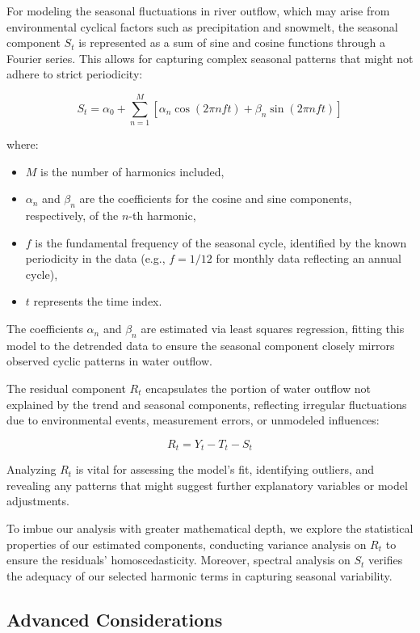 \documentclass[pre,12pt]{revtex4-1}
\begin{document}
For modeling the seasonal fluctuations in river outflow, which may arise from environmental cyclical factors such as precipitation and snowmelt, the seasonal component \(S_t\) is represented as a sum of sine and cosine functions through a Fourier series. This allows for capturing complex seasonal patterns that might not adhere to strict periodicity:

\[ S_t = \alpha_0 + \sum_{n=1}^{M} [\alpha_n \cos(2\pi n f t) + \beta_n \sin(2\pi n f t)] \]

where:
\begin{itemize}
    \item \(M\) is the number of harmonics included,
    \item \(\alpha_n\) and \(\beta_n\) are the coefficients for the cosine and sine components, respectively, of the \(n\)-th harmonic,
    \item \(f\) is the fundamental frequency of the seasonal cycle, identified by the known periodicity in the data (e.g., \(f=1/12\) for monthly data reflecting an annual cycle),
    \item \(t\) represents the time index.
\end{itemize}

The coefficients \(\alpha_n\) and \(\beta_n\) are estimated via least squares regression, fitting this model to the detrended data to ensure the seasonal component closely mirrors observed cyclic patterns in water outflow.


The residual component \(R_t\) encapsulates the portion of water outflow not explained by the trend and seasonal components, reflecting irregular fluctuations due to environmental events, measurement errors, or unmodeled influences:

\[ R_t = Y_t - T_t - S_t \]

Analyzing \(R_t\) is vital for assessing the model's fit, identifying outliers, and revealing any patterns that might suggest further explanatory variables or model adjustments.


To imbue our analysis with greater mathematical depth, we explore the statistical properties of our estimated components, conducting variance analysis on \(R_t\) to ensure the residuals' homoscedasticity. Moreover, spectral analysis on \(S_t\) verifies the adequacy of our selected harmonic terms in capturing seasonal variability.

\subsection{Advanced Considerations}
\end{document}
